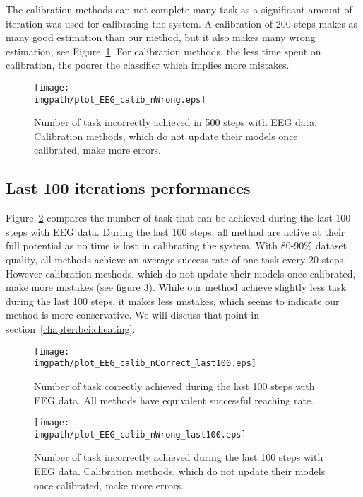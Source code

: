 The calibration methods can not complete many task as a significant amount of iteration was used for calibrating the system. A calibration of 200 steps makes as many good estimation than our method, but it also makes many wrong estimation, see Figure~\ref{fig:nWrongEEG}. For calibration methods, the less time spent on calibration, the poorer the classifier which implies more mistakes.

\begin{figure}[!ht]
\centering
\texttt{[image: \\imgpath/plot\_EEG\_calib\_nWrong.eps]}
\caption{Number of task incorrectly achieved in 500 steps with EEG data. Calibration methods, which do not update their models once calibrated, make more errors.}
\label{fig:nWrongEEG}
\end{figure}

\subsection{Last 100 iterations performances}

Figure~\ref{fig:nCorrectEEG_last100} compares the number of task that can be achieved during the last 100 steps with EEG data. During the last 100 steps, all method are active at their full potential as no time is lost in calibrating the system. With 80-90\% dataset quality, all methods achieve an average success rate of one task every 20 steps. However calibration methods, which do not update their models once calibrated, make more mistakes (see figure \ref{fig:nWrongEEG_last100}). While our method achieve slightly less task during the last 100 steps, it makes less mistakes, which seems to indicate our method is more conservative. We will discuss that point in section~\ref{chapter:bci:cheating}.

\begin{figure}[!ht]
\centering
\texttt{[image: \\imgpath/plot\_EEG\_calib\_nCorrect\_last100.eps]}
\caption{Number of task correctly achieved during the last 100 steps with EEG data. All methods have equivalent successful reaching rate.}
\label{fig:nCorrectEEG_last100}
\end{figure} 

\begin{figure}[!ht]
\centering
\texttt{[image: \\imgpath/plot\_EEG\_calib\_nWrong\_last100.eps]}
\caption{Number of task incorrectly achieved during the last 100 steps with EEG data. Calibration methods, which do not update their models once calibrated, make more errors.}
\label{fig:nWrongEEG_last100}
\end{figure} 

